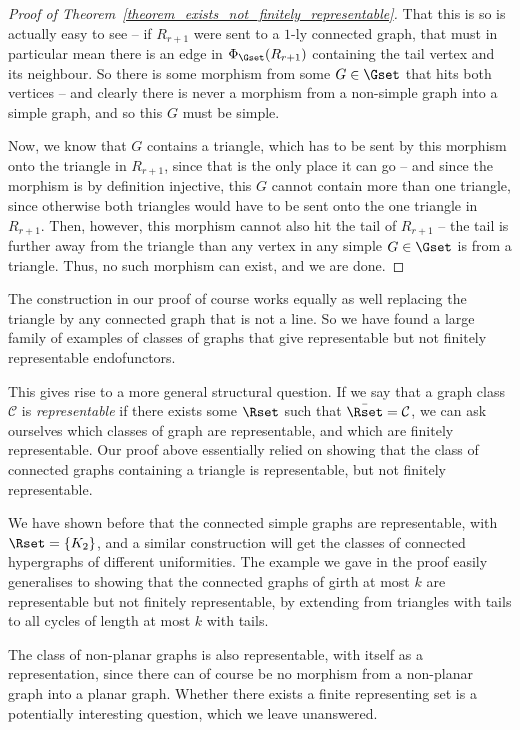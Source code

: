 \documentclass[a4paper,reqno,oneside]{article} %
\begin{document}
\begin{proof}[Proof of Theorem~\ref{theorem_exists_not_finitely_representable}]
    That this is so is actually easy to see -- if $R_{r + 1}$ were sent to a $1$-ly connected graph, that must in particular mean there is an edge in $\Phi_\Gset(R_{r + 1})$ containing the tail vertex and its neighbour. So there is some morphism from some $G \in \Gset$ that hits both vertices -- and clearly there is never a morphism from a non-simple graph into a simple graph, and so this $G$ must be simple.
    
    Now, we know that $G$ contains a triangle, which has to be sent by this morphism onto the triangle in $R_{r + 1}$, since that is the only place it can go -- and since the morphism is by definition injective, this $G$ cannot contain more than one triangle, since otherwise both triangles would have to be sent onto the one triangle in $R_{r+1}$. Then, however, this morphism cannot also hit the tail of $R_{r+1}$ -- the tail is further away from the triangle than any vertex in any simple $G \in \Gset$ is from a triangle. Thus, no such morphism can exist, and we are done.
\end{proof}

\begin{remark}
    The construction in our proof of course works equally as well replacing the triangle by any connected graph that is not a line. So we have found a large family of examples of classes of graphs that give representable but not finitely representable endofunctors.

    This gives rise to a more general structural question. If we say that a graph class $\mathcal{C}$ is \emph{representable} if there exists some $\Rset$ such that $\bar{\Rset} = \mathcal{C}$, we can ask ourselves which classes of graph are representable, and which are finitely representable. Our proof above essentially relied on showing that the class of connected graphs containing a triangle is representable, but not finitely representable.

    We have shown before that the connected simple graphs are representable, with $\Rset = \{K_2\}$, and a similar construction will get the classes of connected hypergraphs of different uniformities. The example we gave in the proof easily generalises to showing that the connected graphs of girth at most $k$ are representable but not finitely representable, by extending from triangles with tails to all cycles of length at most $k$ with tails.

    The class of non-planar graphs is also representable, with itself as a representation, since there can of course be no morphism from a non-planar graph into a planar graph. Whether there exists a finite representing set is a potentially interesting question, which we leave unanswered.
\end{remark}
\end{document}
